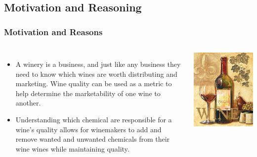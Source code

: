 \documentclass{beamer}
\begin{document}
	\subsection{Motivation and Reasoning}
		\begin{frame}
		\frametitle{Motivation and Reasons}
		\begin{columns}
			
			\begin{itemize}
				\item A winery is a business, and just like any business they need to know which wines are worth distributing and marketing.  Wine quality can be used as a metric to help determine the marketability of one wine to another.  
				\item Understanding which chemical are responsible for a wine's quality allows for winemakers to add and remove wanted and unwanted chemicals from their wine wines while maintaining quality.
			\end{itemize}
			
			
			\includegraphics[width=\textwidth]{images/tuscan wine.png}
		\end{columns}
	\end{frame}
\end{document}
